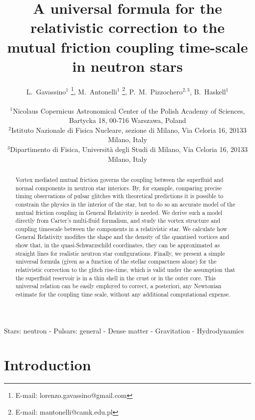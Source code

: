 \documentclass[usenatbib%
]{mnras}
\title[A relativistic correction to the mutual friction coupling time-scale]
{A universal formula for the relativistic correction to the mutual friction coupling time-scale in neutron stars}
\author[L. Gavassino, M. Antonelli, P. Pizzochero \& B. Haskell]{
    L.~Gavassino$^{1}$ \thanks{E-mail: lorenzo.gavassino@gmail.com},
    M.~Antonelli$^{1}$ \thanks{E-mail: mantonelli@camk.edu.pl}, 
    P.~M.~Pizzochero$^{2,3}$,
    B.~Haskell$^{1}$\\ \\
    $^{1}$Nicolaus Copernicus Astronomical Center of the Polish Academy of Sciences, Bartycka 18, 00-716 Warszawa, Poland \\
    $^{2}$Istituto Nazionale di Fisica Nucleare, sezione di Milano, Via Celoria 16, 20133 Milano, Italy\\
    $^{3}$Dipartimento di Fisica, Universit\`a degli Studi di Milano, Via Celoria 16, 20133 Milano, Italy}
\begin{document}
    \pagerange{\pageref{firstpage}--\pageref{lastpage}} 
    \maketitle
    \label{firstpage}

\begin{abstract}
Vortex mediated mutual friction governs the coupling between the superfluid and normal components in neutron star interiors. By, for example, comparing precise timing observations of pulsar glitches with theoretical predictions it is possible to constrain the physics in the interior of the star, but to do so an accurate model of the mutual friction coupling in General Relativity is needed. We derive such a model directly from Carter's multi-fluid formalism, and study the vortex structure and coupling timescale between the components in a relativistic star. We calculate how General Relativity modifies the shape and the density of the quantised vortices and show that, in the quasi-Schwarzschild coordinates, they can be approximated as straight lines for realistic neutron star configurations. Finally, we present a simple universal formula (given as a function of the stellar compactness alone) for the relativistic correction to the glitch rise-time, which is valid under the assumption that the superfluid reservoir is in a thin shell in the crust or in the outer core. This universal relation can be easily employed to correct, a posteriori, any Newtonian estimate for the coupling time scale, without any additional computational expense.
\end{abstract}


\begin{keywords}
Stars: neutron - Pulsars: general - Dense matter - Gravitation - Hydrodynamics
\end{keywords}


\section{Introduction}\label{sec:intro}
\end{document}
